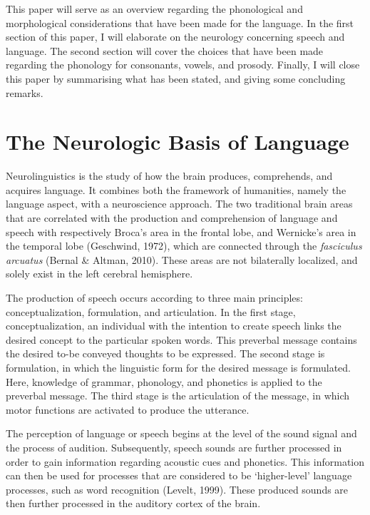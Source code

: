 This paper will serve as an overview regarding the phonological and morphological considerations that have been made for the language. In the first section of this paper, I will elaborate on the neurology concerning speech and language. The second section will cover the choices that have been made regarding the phonology for consonants, vowels, and prosody. Finally, I will close this paper by summarising what has been stated, and giving some concluding remarks.



\section{The Neurologic Basis of Language}

Neurolinguistics is the study of how the brain produces, comprehends, and acquires language. 
It combines both the framework of humanities, namely the language aspect, with a neuroscience approach. The two traditional brain areas that are correlated with the production and comprehension of language and speech with respectively Broca’s area in the frontal lobe, and Wernicke’s area in the temporal lobe (Geschwind, 1972), which are connected through the \textit{fasciculus arcuatus} (Bernal \& Altman, 2010). These areas are not bilaterally localized, and solely exist in the left cerebral hemisphere. 

The production of speech occurs according to three main principles: conceptualization, formulation, and articulation. In the first stage, conceptualization, an individual with the intention to create speech links the desired concept to the particular spoken words. This preverbal message contains the desired to-be conveyed thoughts to be expressed. The second stage is formulation, in which the linguistic form for the desired message is formulated. Here, knowledge of grammar, phonology, and phonetics is applied to the preverbal message. The third stage is the articulation of the message, in which motor functions are activated to produce the utterance. 

The perception of language or speech begins at the level of the sound signal and the process of audition. Subsequently, speech sounds are further processed in order to gain information regarding acoustic cues and phonetics. This information can then be used for processes that are considered to be ‘higher-level’ language processes, such as word recognition (Levelt, 1999). These produced sounds are then further processed in the auditory cortex of the brain. 

